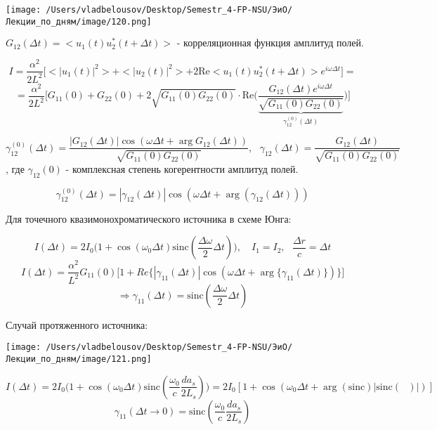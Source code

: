 \documentclass[12pt, a4paper]{report}
\begin{document}
\begin{center}
    \texttt{[image: /Users/vladbelousov/Desktop/Semestr\_4-FP-NSU/ЭиО/Лекции\_по\_дням/image/120.png]}
\end{center}  

\[ G_{12} (\Delta t ) = <u_1 (t ) u_2 ^* (t + \Delta t )> \text{ - корреляционная функция амплитуд полей.} \] 

\[ I = \frac{\alpha ^2 }{ 2 L ^2 } \bigg[  <|u_1 (t )| ^2 >+ <|u_2 (t)| ^2 >+ 2 \mathrm{Re }  {<u_1 (t ) u_2 ^* (t + \Delta t )>e ^{ i \omega \Delta t } }  \bigg]  = \] 
\[ = \frac{\alpha ^2 }{2 L ^2 } \bigg[ G_{11} ( 0 ) + G_{22} (0 ) + 2 \sqrt{G_{11} (0 ) G_{22} (0 )} \cdot \mathrm{Re }  \bigg( \frac{G_{12 } (\Delta t ) e^{ i \omega \Delta t }}{\underbrace{\sqrt{G_{11}(0 ) G_{22}(0 )}}_{\gamma_{12} ^{(0 )}  ( \Delta t )}}   \bigg)  \bigg]  \] 

\[ \gamma_{12} ^{(0 )}  (\Delta t ) = \frac{ |G_{12} (\Delta t ) | \cos ( \omega \Delta t + \arg  G_{12} (\Delta t ))}{ \sqrt{G_{11} (0 ) G_{22}(0)}}  , \text{ }  \gamma_{12} (\Delta t ) = \frac{ G_{12} (\Delta t )}{\sqrt{G_{11}(0 ) G_{22}(0 ) }} \]
, где \( \gamma_{12} (0 ) \) - комплексная степень когерентности амплитуд полей. 

\[ \gamma_{12}^{(0)}(\Delta t ) = |\gamma_{12} (\Delta t )| \cos (\omega \Delta t + \arg (\gamma_{12} (\Delta t ))) \] 

Для точечного квазимонохроматического источника в схеме Юнга: 

\[ I(\Delta t ) = 2 I_0     \bigg(1+ \cos (\omega_0 \Delta t ) \mathrm{ sinc } \left( \frac{\Delta \omega }{2 } \Delta t   \right) \bigg ) , \quad  I_1 = I_2 , \text{ }  \frac{\Delta r }{c } = \Delta t   \] 
\[ I(\Delta t ) = \frac{\alpha ^2 }{L ^2 } G_{11}(0 ) \bigg[1 + Re \bigg\{|\gamma_{11}(\Delta t) |\cos (\omega \Delta t + \arg \{\gamma_{11} (\Delta t)\})\bigg\}\bigg]  \] 
\[ \Rightarrow \gamma_{11} (\Delta t ) = \mathrm{sinc }  \left( \frac{\Delta \omega }{2 } \Delta t   \right)  \] 

Случай протяженного источника: 

\begin{center}
    \texttt{[image: /Users/vladbelousov/Desktop/Semestr\_4-FP-NSU/ЭиО/Лекции\_по\_дням/image/121.png]}
\end{center}  

\[ I( \Delta t )  = 2 I_0 \bigg(1 + \cos (\omega_0 \Delta t ) \mathrm{sinc }  \left( \frac{\omega_0 }{c } \frac{ d a_s }{2 L_s}   \right) \bigg) = 2 I_0 [1 + \cos (\omega_0 \Delta t + \arg (\mathrm{sinc }  )|\mathrm{sinc } (\text{ } ) |)] \] 
\[ \gamma_{11}(\Delta t \to  0 ) = \mathrm{sinc }  \left(  \frac{\omega_0 }{c } \frac{d a_s }{2 L_s}   \right)  \] 
\end{document}
